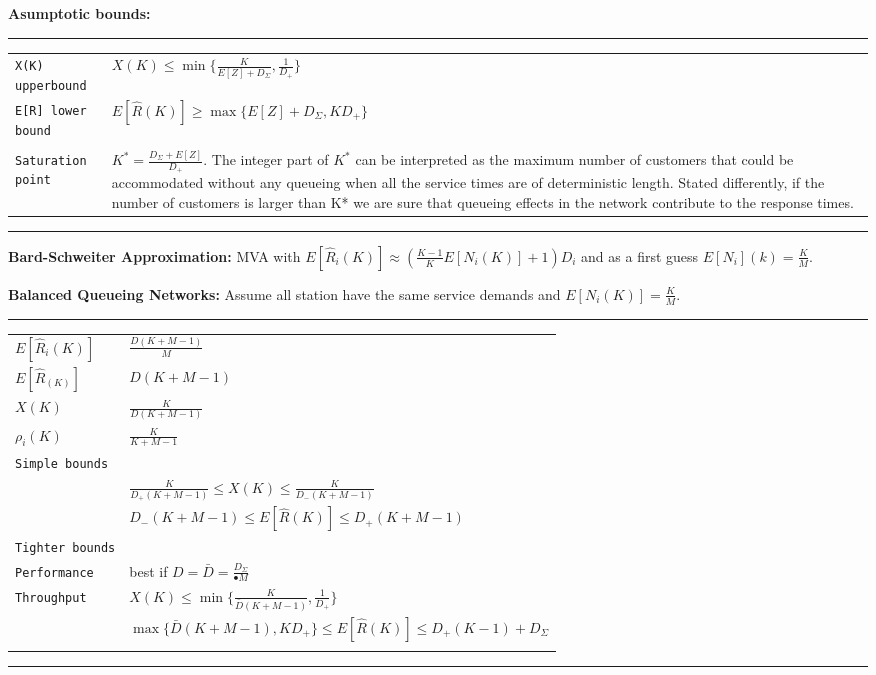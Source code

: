 \textbf{Asumptotic bounds:}
\hrule
{}
\begin{tabular}{@{}p{\the\MyLen}@{}p{\linewidth-\the\MyLen}@{}}
\verb!X(K) upperbound! 	&  $X(K) \leq \min\{\frac{K}{E[Z] + D_\Sigma}, \frac{1}{D_+}\}$\\
\verb!E[R] lower bound! 	&  $E[\hat{R}(K)] \geq \max\{E[Z] + D_\Sigma, KD_+\}$\\
\verb!! 	&  \\
\verb!Saturation point! 	&  $K^*  = \frac{D_\Sigma + E[Z]}{D_+}$. The integer part of $K^*$ can be interpreted as the maximum number of customers that could be accommodated without any queueing when all the service times are of deterministic length. Stated differently, if the number of customers is larger than K* we are sure that queueing effects in the network contribute to the response times.\\
\end{tabular}
\hrule

\textbf{Bard-Schweiter Approximation:}
MVA with $E[\hat{R}_i(K)] \approx (\frac{K-1}{K} E[N_i(K)] + 1) D_i$ and as a first guess $E[N_i](k) = \frac{K}{M}$.

\textbf{Balanced Queueing Networks:} Assume all station have the same service demands and $E[N_i(K)] = \frac{K}{M}$.
\hrule
{}
\begin{tabular}{@{}p{\the\MyLen}@{}p{\linewidth-\the\MyLen}@{}}
$E[\hat{R}_i(K)]$ 	&  $\frac{D(K+M-1)}{M}$\\
$E[\hat{R}_(K)]$ 	&  $D(K+M-1)$\\
$X(K)$ 	&  $\frac{K}{D(K+M-1)}$\\
$\rho_i(K)$ 	&  $\frac{K}{K+M-1}$\\
\verb!Simple bounds! 	&  \\
			& $\frac{K}{D_+(K+M-1)} \leq X(K) \leq \frac{K}{D_-(K+M-1)}$\\
			& $D_-(K+M-1) \leq E[\hat{R}(K)] \leq D_+(K+M-1)$\\
\verb!Tighter bounds! 	&  \\
\verb!Performance! 	&  best if $D = \bar{D} = \frac{D_\Sigma}{•M}$\\
\verb!Throughput! 	&  $X(K) \leq \min\{\frac{K}{\bar{D}(K+M-1)}, 
\frac{1}{D_+}\}$\\
&  $\max\{\bar{D}(K+M-1), KD_+\} \leq E[\hat{R}(K)] \leq D_+(K-1) + D_\Sigma$\\\\
\end{tabular}
\hrule